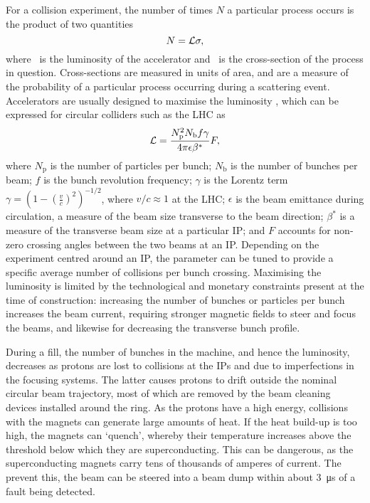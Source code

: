 For a collision experiment, the number of times $N$ a particular process occurs 
is the product of two quantities
\begin{equation}
  N = \mathcal{L}\sigma,
  \label{eqn:intro:lhc:lumi_xsec}
\end{equation}
where \lumi\ is the luminosity of the accelerator and \xsec\ is the 
cross-section of the process in question.
Cross-sections are measured in units of area, and are a measure of the 
probability of a particular process occurring during a scattering event.
Accelerators are usually designed to maximise the luminosity \lumi, which can 
be expressed for circular colliders such as the \ac{LHC} as
\begin{equation}
  \mathcal{L} = \frac{N_{\text{p}}^{2}N_{\text{b}}f\gamma}{4\pi\epsilon\beta^{*}}F,
\end{equation}
where $N_{\text{p}}$ is the number of particles per bunch; $N_{\text{b}}$ is 
the number of bunches per beam; $f$ is the bunch revolution frequency; $\gamma$ 
is the Lorentz term $\gamma = {(1 - {(\frac{v}{c})}^{2})}^{-1/2}$, where $v/c 
\approx 1$ at the \ac{LHC}; $\epsilon$ is the beam emittance during 
circulation, a measure of the beam size transverse to the beam direction; 
$\beta^{*}$ is a measure of the transverse beam size at a particular \ac{IP}; 
and $F$ accounts for non-zero crossing angles between the two beams at an 
\ac{IP}.
Depending on the experiment centred around an \ac{IP}, the \betastar parameter 
can be tuned to provide a specific average number of collisions per bunch 
crossing.
Maximising the luminosity is limited by the technological and monetary 
constraints present at the time of construction: increasing the number of 
bunches or particles per bunch increases the beam current, requiring stronger 
magnetic fields to steer and focus the beams, and likewise for decreasing the 
transverse bunch profile.

During a fill, the number of bunches in the machine, and hence the luminosity, 
decreases as protons are lost to collisions at the \acp{IP} and due to 
imperfections in the focusing systems.
The latter causes protons to drift outside the nominal circular beam 
trajectory, most of which are removed by the beam cleaning devices installed 
around the ring.
As the protons have a high energy, collisions with the magnets can generate 
large amounts of heat.
If the heat build-up is too high, the magnets can `quench', whereby their 
temperature increases above the threshold below which they are superconducting.
This can be dangerous, as the superconducting magnets carry tens of thousands 
of amperes of current.
The prevent this, the beam can be steered into a beam dump within about 
\SI{3}{\micro\second} of a fault being detected.

